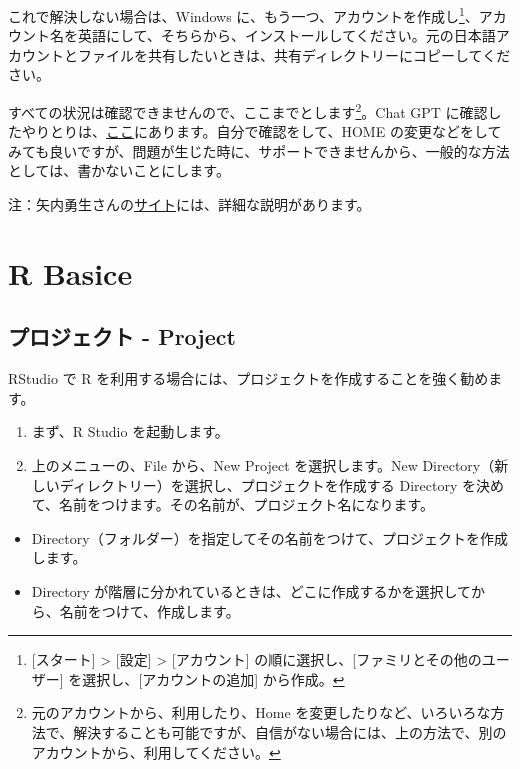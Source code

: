 \documentclass[
]{bxjsbook}
\providecommand{\tightlist}{%
  \setlength{\itemsep}{0pt}\setlength{\parskip}{0pt}}
\theoremstyle{definition}
\theoremstyle{definition}
\theoremstyle{definition}
\theoremstyle{definition}
\theoremstyle{remark}
\begin{document}
これで解決しない場合は、Windows に、もう一つ、アカウントを作成し\footnote{{[}スタート{]} \textgreater{} {[}設定{]} \textgreater{} {[}アカウント{]} の順に選択し、{[}ファミリとその他のユーザー{]} を選択し、{[}アカウントの追加{]} から作成。}、アカウント名を英語にして、そちらから、インストールしてください。元の日本語アカウントとファイルを共有したいときは、共有ディレクトリーにコピーしてください。

すべての状況は確認できませんので、ここまでとします\footnote{元のアカウントから、利用したり、Home を変更したりなど、いろいろな方法で、解決することも可能ですが、自信がない場合には、上の方法で、別のアカウントから、利用してください。}。Chat GPT に確認したやりとりは、\href{https://icu-hsuzuki.github.io/ds_education/chatgpt.html\#chatgpt}{ここ}にあります。自分で確認をして、HOME の変更などをしてみても良いですが、問題が生じた時に、サポートできませんから、一般的な方法としては、書かないことにします。

注：矢内勇生さんの\href{https://yukiyanai.github.io/jp/resources/docs/install-R_windows.pdf}{サイト}には、詳細な説明があります。

\hypertarget{rbasics}{%
\section{R Basice}\label{rbasics}}

\hypertarget{ux30d7ux30edux30b8ux30a7ux30afux30c8---project}{%
\subsection{プロジェクト - Project}\label{ux30d7ux30edux30b8ux30a7ux30afux30c8---project}}

RStudio で R を利用する場合には、プロジェクトを作成することを強く勧めます。

\begin{enumerate}
\def\labelenumi{\arabic{enumi}.}
\item
  まず、R Studio を起動します。
\item
  上のメニューの、File から、New Project を選択します。New Directory（新しいディレクトリー）を選択し、プロジェクトを作成する Directory を決めて、名前をつけます。その名前が、プロジェクト名になります。
\end{enumerate}

\begin{itemize}
\tightlist
\item
  Directory（フォルダー）を指定してその名前をつけて、プロジェクトを作成します。
\item
  Directory が階層に分かれているときは、どこに作成するかを選択してから、名前をつけて、作成します。
\end{itemize}
\end{document}
